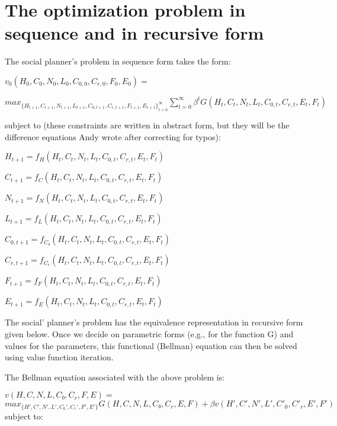 \documentclass[12pt,reqno]{amsart}
\theoremstyle{mytheorem}
\theoremstyle{myremark}
\begin{document}
\section{The optimization problem in sequence and in recursive form}

    The social planner's problem in sequence form takes the form:
    \bigskip
    
    $v_0(H_0,C_0,N_0,L_0,C_{0,0},C_{r,0},F_0,E_0)=$
    
    $max_{{\{H_{t+1},C_{t+1},N_{t+1},L_{t+1},C_{0,t+1},C_{r,t+1},F_{t+1},E_{t+1}\}}_{t=0}^{\infty}} 
    \sum_{t=0}^{\infty}\beta^{t}G(H_{t},C_{t},N_{t},L_{t},C_{0,t},C_{r,t},E_{t},F_{t})$
     \bigskip
     
    subject to (these constraints are written in abstract form, but they will be the difference equations Andy wrote after correcting for typos):
     \bigskip
     
    $H_{t+1}=f_{H}(H_{t},C_{t},N_{t},L_{t},C_{0,t},C_{r,t},E_{t},F_{t})$
    
    $C_{t+1}=f_{C}(H_{t},C_{t},N_{t},L_{t},C_{0,t},C_{r,t},E_{t},F_{t})$
    
    $N_{t+1}=f_{N}(H_{t},C_{t},N_{t},L_{t},C_{0,t},C_{r,t},E_{t},F_{t})$
    
    $L_{t+1}=f_{L}(H_{t},C_{t},N_{t},L_{t},C_{0,t},C_{r,t},E_{t},F_{t})$
    
    $C_{0,t+1}=f_{C₀}(H_{t},C_{t},N_{t},L_{t},C_{0,t},C_{r,t},E_{t},F_{t})$
    
    $C_{r,t+1}=f_{C_{r}}(H_{t},C_{t},N_{t},L_{t},C_{0,t},C_{r,t},E_{t},F_{t})$
    
    $F_{t+1}=f_{F}(H_{t},C_{t},N_{t},L_{t},C_{0,t},C_{r,t},E_{t},F_{t})$
    
    $E_{t+1}=f_{E}(H_{t},C_{t},N_{t},L_{t},C_{0,t},C_{r,t},E_{t},F_{t})$
     \bigskip
     
    The social' planner's problem has the equivalence representation in recursive form given below. Once we decide on parametric forms (e.g., for the function G) and values for the parameters, this functional (Bellman) equation can then be solved using value function iteration. 
     \bigskip
     
   The Bellman equation associated with the above problem is:
     \bigskip
     
    $v(H,C,N,L,C₀,C_{r},F,E)=$
    $max_{\{H',C′,N′,L′,C_{0}′,C_{r}′,F′,E′\}}
    G(H,C,N,L,C₀,C_{r},E,F)+\beta v(H',C',N',L',C'_{0},C'_{r},E',F')$
    subject to:
     \bigskip
     
\end{document}
